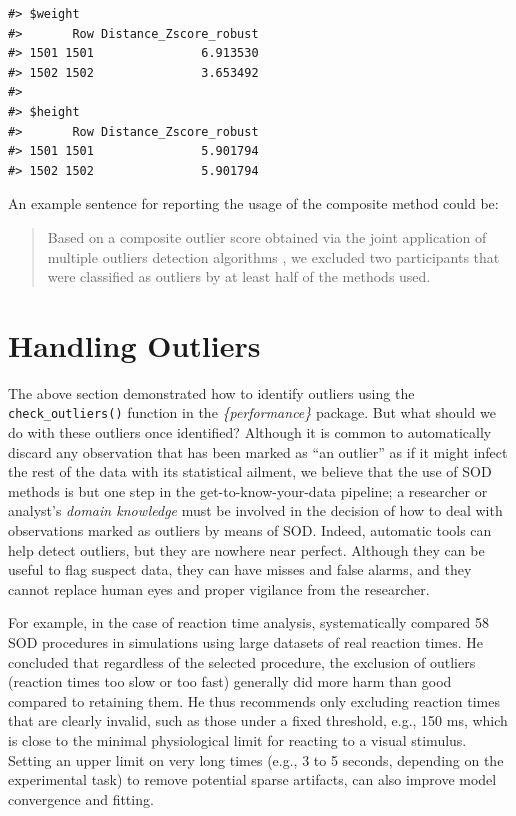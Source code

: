 \documentclass[sn-basic, lineno,pdflatex]{sn-jnl}
\begin{document}
\begin{verbatim}
#> $weight
#>       Row Distance_Zscore_robust
#> 1501 1501               6.913530
#> 1502 1502               3.653492
#> 
#> $height
#>       Row Distance_Zscore_robust
#> 1501 1501               5.901794
#> 1502 1502               5.901794
\end{verbatim}

An example sentence for reporting the usage of the composite method
could be:

\begin{quote}
Based on a composite outlier score \citep[see the `check\_outliers()'
function in the `performance' R package,][]{ludecke2021performance}
obtained via the joint application of multiple outliers detection
algorithms \citetext{\citealp[(a) median absolute deviation (MAD)-based
robust \emph{z} scores,][]{leys2013outliers}; \citealp[(b) Mahalanobis
minimum covariance determinant (MCD),][]{leys2019outliers}; \citealp[and
(c) Cook's distance,][]{cook1977detection}}, we excluded two
participants that were classified as outliers by at least half of the
methods used.
\end{quote}

\section{Handling Outliers}\label{handling-outliers}

The above section demonstrated how to identify outliers using the
\texttt{check\_outliers()} function in the \emph{\{performance\}}
package. But what should we do with these outliers once identified?
Although it is common to automatically discard any observation that has
been marked as ``an outlier'' as if it might infect the rest of the data
with its statistical ailment, we believe that the use of SOD methods is
but one step in the get-to-know-your-data pipeline; a researcher or
analyst's \emph{domain knowledge} must be involved in the decision of
how to deal with observations marked as outliers by means of SOD.
Indeed, automatic tools can help detect outliers, but they are nowhere
near perfect. Although they can be useful to flag suspect data, they can
have misses and false alarms, and they cannot replace human eyes and
proper vigilance from the researcher.

For example, in the case of reaction time analysis,
\citet{miller2023outlier} systematically compared 58 SOD procedures in
simulations using large datasets of real reaction times. He concluded
that regardless of the selected procedure, the exclusion of outliers
(reaction times too slow or too fast) generally did more harm than good
compared to retaining them. He thus recommends only excluding reaction
times that are clearly invalid, such as those under a fixed threshold,
e.g., 150 ms, which is close to the minimal physiological limit for
reacting to a visual stimulus. Setting an upper limit on very long times
(e.g., 3 to 5 seconds, depending on the experimental task) to remove
potential sparse artifacts, can also improve model convergence and
fitting.
\end{document}
